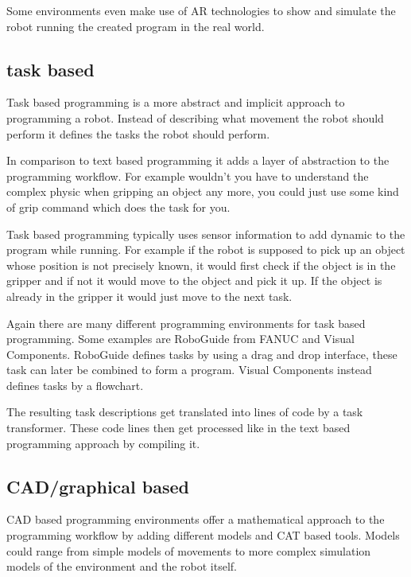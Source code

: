 \documentclass[conference]{IEEEtran}
\begin{document}
        Some environments even make use of AR technologies to show and simulate the robot running the created program in the real world.
        

    \subsection{task based}

        Task based programming is a more abstract and implicit approach to programming a robot.
        Instead of describing what movement the robot should perform it defines the tasks the robot should perform.
       
        In comparison to text based programming it adds a layer of abstraction to the programming workflow. For example wouldn't you have to understand the complex physic when gripping an object any more, you could just use some kind of grip command which does the task for you. %

        Task based programming typically uses sensor information to add dynamic to the program while running. For example if the robot is supposed to pick up an object whose position is not precisely known, it would first check if the object is in the gripper and if not it would move to the object and pick it up. If the object is already in the gripper it would just move to the next task.

        Again there are many different programming environments for task based programming. Some examples are RoboGuide from FANUC and Visual Components. RoboGuide defines tasks by using a drag and drop interface, these task can later be combined to form a program.
        Visual Components instead defines tasks by a flowchart.

        The resulting task descriptions get translated into lines of code by a task transformer. These code lines then get processed like in the text based programming approach by compiling it. %

        

    \subsection{CAD/graphical based}

        CAD based programming environments offer a mathematical approach to the programming workflow by adding different models and CAT based tools.
        Models could range from simple models of movements to more complex simulation models of the environment and the robot itself. %
\end{document}
